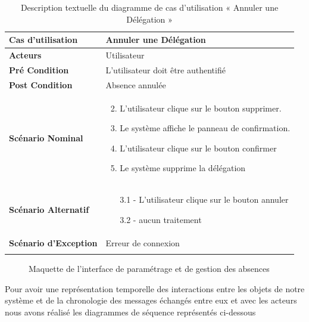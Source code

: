 \begin{longtable}{|p{5cm}|p{10cm}|}
\hline
\textbf{Cas d'utilisation}&Annuler une Délégation       \\
\hline
\textbf{Acteurs}&Utilisateur\\
\hline
\textbf{Pré Condition}&L'utilisateur doit être authentifié\\
\hline
\textbf{Post Condition}&Absence annulée \\
\hline
\textbf{Scénario Nominal}&
\vspace{-\baselineskip}
\begin{enumerate}
  \setcounter{enumi}{1}
  \item L'utilisateur clique sur le bouton supprimer.
  \item Le système affiche le panneau de confirmation.
  \item L'utilisateur clique sur le bouton confirmer
  \item Le système supprime la délégation 
\end{enumerate}\\
\hline
\textbf{Scénario Alternatif}&
\vspace{-\baselineskip}
\begin{enumerate}
  \item [3.1]- L'utilisateur clique sur le bouton annuler
  \item [3.2]- aucun traitement
\end{enumerate}\\
\hline
\textbf{Scénario d'Exception}&
Erreur de connexion\\
\hline
\caption{Description textuelle du diagramme de cas d'utilisation « Annuler une Délégation       »}
\label{tab:use_case_cancel_delegate}
\end{longtable}

\begin{figure}[H]
  \centering
  \caption{Maquette de l'interface de paramétrage et de gestion des absences}
  \label{fig:MaquetteInterfaceParametrageGestionAbsences}
\end{figure}


Pour avoir une représentation temporelle des interactions entre les objets de notre système et de la chronologie des messages échangés entre eux et avec les acteurs nous avons réalisé les diagrammes de séquence représentés ci-dessous

